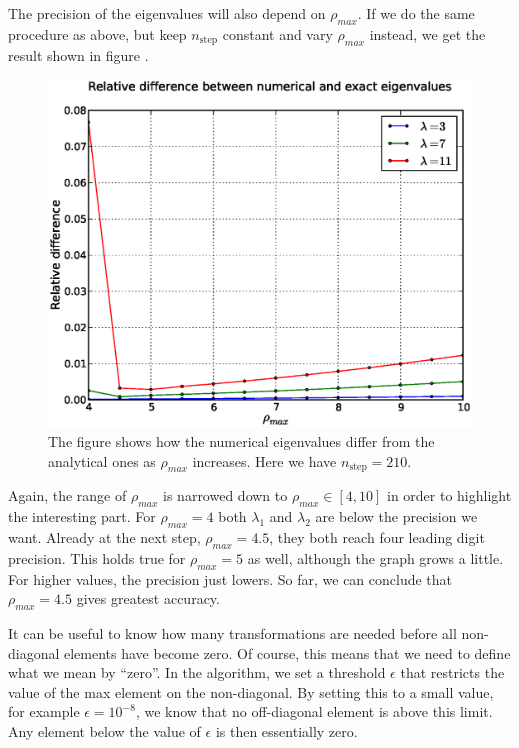The precision of the eigenvalues will also depend on $\rho_{max}$. If we do the same
procedure as above, but keep $n_{\mathrm{step}}$ constant and vary $\rho_{max}$ instead, we get the
result shown in figure .
%
\begin{figure}[htpb]
	\centering
	\includegraphics[width=1.0\textwidth]{images/reldiff2.eps}
	\caption{The figure shows how the numerical eigenvalues differ from the analytical
		ones as $\rho_{max}$ increases. Here we have $n_{\mathrm{step}} = 210$.}
	\label{fig:rhoreldiff}
\end{figure}
%
Again, the range of $\rho_{max}$ is narrowed down to $\rho_{max} \in [4,10]$ in order to
highlight the interesting part. For $\rho_{max} = 4$ both $\lambda_1$ and $\lambda_2$ are
below the precision we want. Already at the next step, $\rho_{max} = 4.5$, they both
reach four leading digit precision. This holds true for $\rho_{max} = 5$ as well, although
the graph grows a little. For higher values, the precision just lowers.
So far, we can conclude that $\rho_{max} = 4.5$ gives greatest accuracy.

It can be useful to know how many transformations are needed before all non-diagonal
elements have become zero. Of course, this means that we need to define what we mean by
``zero''. In the algorithm, we set a threshold $\epsilon$ that restricts the value of the
max element on the non-diagonal. By setting this to a small value, for example $\epsilon =
10^{-8}$, we know that no off-diagonal element is above this limit. Any element below the
value of $\epsilon$ is then essentially zero.

